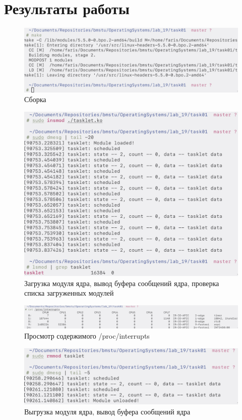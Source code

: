 \section{Результаты работы}

\begin{figure}[H]
    \centering
    \caption{Сборка}
    \includegraphics[scale=0.375]{images/scr1_1.png}
\end{figure}
\begin{figure}[H]
    \centering
    \caption{Загрузка модуля ядра, вывод буфера сообщений ядра, проверка списка загруженных модулей}
    \includegraphics[scale=0.375]{images/scr1_2.png}
\end{figure}
\begin{figure}[H]
    \centering
    \caption{Просмотр содержимого /proc/interrupts}
    \includegraphics[scale=0.235]{images/scr1_3.png}
\end{figure}
\begin{figure}[H]
    \centering
    \caption{Выгрузка модуля ядра, вывод буфера сообщений ядра}
    \includegraphics[scale=0.375]{images/scr1_4.png}
\end{figure}
